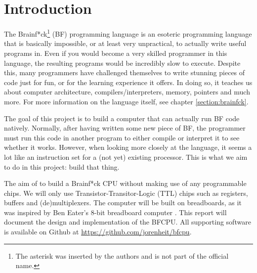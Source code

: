 \section{Introduction}
The Brainf*ck\footnote{The asterisk was inserted by the authors and is not part of the official name.} (BF) programming language is an esoteric programming language that is basically impossible, or at least very unpractical, to actually write useful programs in. Even if you would become a very skilled programmer in this language, the resulting programs would be incredibly slow to execute. Despite this, many programmers have challenged themselves to write stunning pieces of code just for fun, or for the learning experience it offers. In doing so, it teaches us about computer architecture, compilers/interpreters, memory, pointers and much more. For more information on the language itself, see chapter \ref{section:brainfck}.

The goal of this project is to build a computer that can actually run BF code natively. Normally, after having written some new piece of BF, the programmer must run this code in another program to either compile or interpret it to see whether it works. However, when looking more closely at the language, it seems a lot like an instruction set for a (not yet) existing processor. This is what we aim to do in this project: build that thing.

The aim of to build a Brainf*ck CPU without making use of any programmable chips. We will only use Transistor-Transitor-Logic (TTL) chips such as registers, buffers and (de)multiplexers. The computer will be built on breadboards, as it was inspired by Ben Eater's 8-bit breadboard computer \cite{beneater}. This report will document the design and implementation of the BFCPU. All supporting software is available on Github at \url{https://github.com/jorenheit/bfcpu}.
